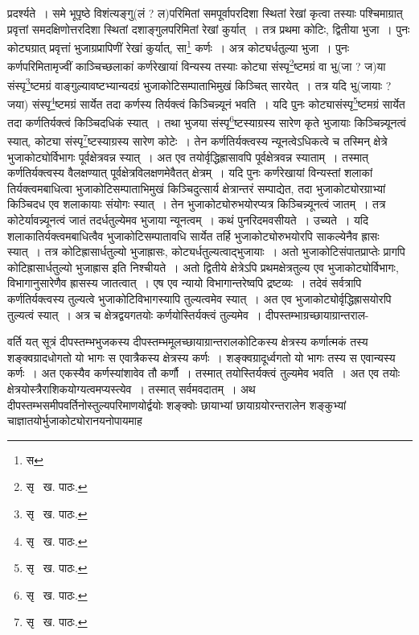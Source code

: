 \documentclass[11pt, openany]{book}
\begin{document}
\noindent प्रदर्श्यते~। समे भूपृष्ठे विशंत्यङ्गु(लं ? ल)परिमितां समपूर्वापरदिशा स्थितां रेखां कृत्वा तस्याः पश्चिमाग्रात् प्रवृत्तां समदक्षिणोत्तरदिशा स्थितां दशाङ्गुलपरिमितां रेखां कुर्यात्~। तत्र प्रथमा कोटिः, द्वितीया भुजा~। पुनः कोट्यग्रात् प्रवृत्तां भुजाग्रप्रापिणीं रेखां कुर्यात्, सा\renewcommand{\thefootnote}{१}\footnote{स} कर्णः~। अत्र कोट्यर्धतुल्या भुजा~। पुनः कर्णपरिमितामृज्वीं काञ्चिच्छलाकां कर्णरेखायां विन्यस्य तस्याः कोट्या संस्पृ\renewcommand{\thefootnote}{२}\footnote{सृ \textendash\ ख. पाठः.}ष्टमग्रं वा भु(जा ? ज)या संस्पृ\renewcommand{\thefootnote}{३}\footnote{सृ \textendash\ ख. पाठः.}ष्टमग्रं वाङ्गुल्यावष्टभ्यान्यदग्रं भुजाकोटिसम्पाताभिमुखं किञ्चित् सारयेत्~। तत्र यदि भु(जायाः ? जया) संस्पृ\renewcommand{\thefootnote}{४}\footnote{सृ \textendash\ ख. पाठः.}ष्टमग्रं सार्येत तदा कर्णस्य तिर्यक्त्वं किञ्चिन्न्यूनं भवति~। यदि पुनः कोट्यासंस्पृ\renewcommand{\thefootnote}{५}\footnote{सृ \textendash\ ख. पाठः.}ष्टमग्रं सार्येत तदा कर्णतिर्यक्त्वं किञ्चिदधिकं स्यात्~। तथा भुजया संस्पृ\renewcommand{\thefootnote}{६}\footnote{सृ \textendash\ ख. पाठः.}ष्टस्याग्रस्य सारेण कृते भुजायाः किञ्चिन्न्यूनत्वं स्यात्, कोट्या संस्पृ\renewcommand{\thefootnote}{७}\footnote{सृ \textendash\ ख. पाठः.}ष्टस्याग्रस्य सारेण कोटेः~। तेन कर्णतिर्यक्त्वस्य न्यूनत्वेऽधिकत्वे च तस्मिन् क्षेत्रे भुजाकोट्योर्विभागः पूर्वक्षेत्रवन्न स्यात्~। अत एव तयोर्वृद्धिह्रासावपि पूर्वक्षेत्रवन्न स्याताम्~। तस्मात् कर्णतिर्यक्त्वस्य वैलक्षण्यात् पूर्वक्षेत्रविलक्षणमेवैतत् क्षेत्रम्~। यदि पुनः कर्णरेखायां विन्यस्तां शलाकां तिर्यक्त्वमबाधित्वा भुजाकोटिसम्पाताभिमुखं किञ्चिदुत्सार्य क्षेत्रान्तरं
सम्पाद्येत, तदा भुजाकोट्योरग्राभ्यां किञ्चिदध एव शलाकायाः संयोगः स्यात्~। तेन भुजाकोट्योरुभयोरप्यत्र किञ्चिन्न्यूनत्वं जातम्~। तत्र
कोटेर्यावन्न्यूनत्वं जातं तदर्धतुल्येमव भुजाया न्यूनत्वम्~। कथं पुनरिदमवसीयते~। उच्यते~। यदि शलाकातिर्यक्त्वमबाधित्वैव भुजाकोटिसम्पातावधि सार्येत तर्हि भुजाकोट्योरुभयोरपि साकल्येनैव ह्रासः स्यात्~। तत्र कोटिह्रासार्धतुल्यो भुजाह्रासः, कोट्यर्धतुल्यत्वाद्भुजायाः~। अतो भुजाकोटिसंपातप्राप्तेः प्रागपि कोटिह्रासार्धतुल्यो भुजाह्रास इति निश्चीयते~। अतो द्वितीये क्षेत्रेऽपि प्रथमक्षेत्रतुल्य एव भुजाकोट्योर्विभागः,
विभागानुसारेणैव ह्रासस्य जातत्वात्~। एष एव न्यायो विभागान्तरेष्वपि द्रष्टव्यः~। तदेवं सर्वत्रापि कर्णतिर्यक्त्वस्य तुल्यत्वे भुजाकोटिविभागस्यापि
तुल्यत्वमेव स्यात्~। अत एव भुजाकोट्योर्वृद्धिह्रासयोरपि तुल्यत्वं स्यात्~। अत्र च क्षेत्रद्वयगतयोः कर्णयोस्तिर्यक्त्वं तुल्यमेव~।
दीपस्तम्भाग्रच्छायाग्रान्तराल-

\newpage

\noindent वर्ति यत् सूत्रं दीपस्तम्भभुजकस्य दीपस्तम्भमूलच्छायाग्रान्तरालकोटिकस्य क्षेत्रस्य कर्णात्मकं तस्य शङ्क्वग्रादधोगतो यो भागः स एवात्रैकस्य क्षेत्रस्य कर्णः~। शङ्क्वग्रादूर्ध्वगतो यो भागः तस्य स एवान्यस्य कर्णः~। अत एकस्यैव कर्णस्यांशावेव तौ कर्णौ~। तस्मात् तयोस्तिर्यक्त्वं तुल्यमेव भवति~। अत एव तयोः क्षेत्रयोस्त्रैराशिकयोग्यत्वमप्यस्त्येव~। तस्मात् सर्वमवदातम्~। अथ दीपस्तम्भसमीपवर्तिनोस्तुल्यपरिमाणयोर्द्वयोः शङ्क्वोः छायाभ्यां छायाग्रयोरन्तरालेन शङ्कुभ्यां चाज्ञातयोर्भुजाकोट्योरानयनोपायमाह\textendash 
\end{document}
